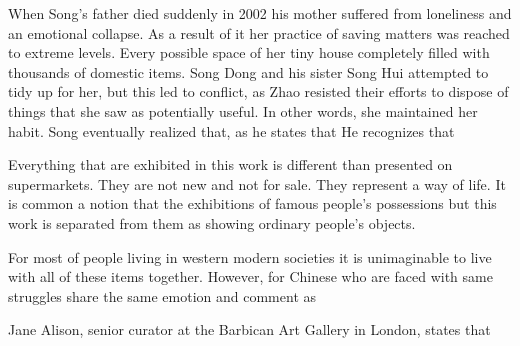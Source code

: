 When Song’s father died suddenly in 2002 his mother suffered from loneliness and an emotional collapse. As a result of it her practice of saving matters was reached to extreme levels. Every possible space of her tiny house completely filled with thousands of domestic items. Song Dong and his sister Song Hui attempted to tidy up for her, but this led to conflict, as Zhao resisted their efforts to dispose of things that she saw as potentially useful. In other words, she maintained her habit. Song eventually realized that, as he states that  He recognizes that 

Everything that are exhibited in this work is different than presented on supermarkets. They are not new and not for sale. They represent a way of life. It is common a notion that the exhibitions of famous people’s possessions but this work is separated from them as showing ordinary people’s objects.

For most of people living in western modern societies it is unimaginable to live with all of these items together. However, for Chinese who are faced with same struggles share the same emotion and comment as 

Jane Alison, senior curator at the Barbican Art Gallery in London, states that  \citep[as cited in][]{needham2015chinese}



